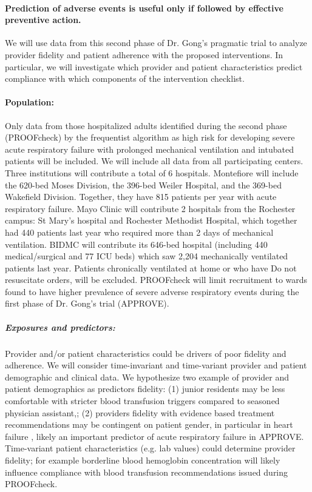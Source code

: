 \documentclass[11pt,notitlepage]{article}
\begin{document}
\paragraph*{Prediction of adverse events is useful only if followed by effective preventive action. } We will use data from this second phase of Dr. Gong's pragmatic trial to analyze provider fidelity and patient adherence with the proposed interventions. In particular, we will investigate which provider and patient characteristics predict compliance with which components of the intervention checklist. 

\paragraph*{Population:} 
Only data from those hospitalized adults identified during the second phase (PROOFcheck) by the frequentist algorithm as high risk for developing severe acute respiratory failure with prolonged mechanical ventilation and intubated patients will be included. We will include all data from all participating centers. Three institutions will contribute a total of 6 hospitals. Montefiore will include the 620-bed Moses Division, the 396-bed Weiler Hospital, and the 369-bed Wakefield Division. Together, they have 815 patients per year with acute respiratory failure.  Mayo Clinic will contribute 2 hospitals from the Rochester campus: St Mary’s hospital and Rochester Methodist Hospital, which together had 440 patients last year who required more than 2 days of mechanical ventilation.  BIDMC will contribute its 646-bed hospital (including 440 medical/surgical and 77 ICU beds) which saw 2,204 mechanically ventilated patients last year. Patients chronically ventilated at home or who have Do not resuscitate orders, will be excluded. PROOFcheck will limit recruitment to wards found to have higher prevalence of severe adverse respiratory events during the first phase of Dr. Gong's trial (APPROVE). 

\subparagraph*{Exposures and predictors:}
Provider and/or patient characteristics could be drivers of poor fidelity and adherence. We will consider time-invariant and time-variant provider and patient demographic and clinical data. We hypothesize two example of provider and patient demographics as predictors fidelity: (1) junior residents may be less comfortable with stricter blood transfusion triggers compared to seasoned physician assistant,; (2) providers fidelity with evidence based treatment recommendations may be contingent on patient gender, in particular in heart failure \cite{Cook_25714825}, likely an important predictor of acute respiratory failure in APPROVE. Time-variant patient characteristics (e.g. lab values) could determine provider fidelity; for example borderline blood hemoglobin concentration will likely influence compliance with blood transfusion recommendations issued during PROOFcheck. 
\end{document}
